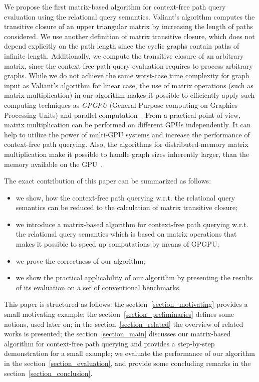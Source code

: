 We propose the first matrix-based algorithm for context-free path query evaluation using the relational query semantics. Valiant's algorithm computes the transitive closure of an upper triangular matrix by increasing the length of paths considered. We use another definition of matrix transitive closure, which does not depend explicitly on the path length since the cyclic graphs contain paths of infinite length. Additionally, we compute the transitive closure of an arbitrary matrix, since the context-free path query evaluation requires to process arbitrary graphs. While we do not achieve the same worst-case time complexity for graph input as Valiant's algorithm for linear case, the use of matrix operations (such as matrix multiplication) in our algorithm makes it possible to efficiently apply such computing techniques as \textit{GPGPU} (General-Purpose computing on Graphics Processing Units) and parallel computation~\cite{matricesOnGPGPU}. From a practical point of view, matrix multiplication can be performed on different GPUs independently. It can help to utilize the power of multi-GPU systems and increase the performance of context-free path querying. Also, the algorithms for distributed-memory matrix multiplication make it possible to handle graph sizes inherently larger, than the memory available on the GPU~\cite{MM_on_multi-GPU, hetero_multi-GPU, choi1994pumma}.

The exact contribution of this paper can be summarized as follows:

\begin{itemize}
\item we show, how the context-free path querying w.r.t. the relational query semantics can be reduced to the calculation of matrix transitive closure;
\item we introduce a matrix-based algorithm for context-free path querying w.r.t. the relational query semantics which is based on matrix operations that makes it possible to speed up computations by means of GPGPU;
\item we prove the correctness of our algorithm;
\item we show the practical applicability of our algorithm by presenting the results of its evaluation on a set of conventional benchmarks.
\end{itemize}

This paper is structured as follows: the section~\ref{section_motivating} provides a small motivating example; the section~\ref{section_preliminaries} defines some notions, used later on; in the section~\ref{section_related} the overview of related works is presented; the section~\ref{section_main} discusses our matrix-based algorithm for context-free path querying and provides a step-by-step demonstration for a small example;  we evaluate the performance of our algorithm in the section~\ref{section_evaluation}, and provide some concluding remarks in the section~\ref{section_conclusion}.
